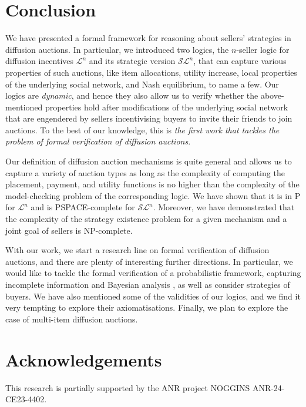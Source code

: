 \documentclass[letterpaper]{article} %
\theoremstyle{definition}
\begin{document}
\section{Conclusion}
We have presented a formal framework for reasoning about sellers' strategies in diffusion auctions. In particular, we introduced two logics, the $n$-seller logic for diffusion incentives $\mathcal{L}^n$ and its strategic version $\mathcal{SL}^n$, that can capture various properties of such auctions, like item allocations, utility increase, local properties of the underlying social network, and Nash equilibrium, to name a few. Our logics are \textit{dynamic}, and hence they also allow us to verify whether the above-mentioned properties hold after modifications of the underlying social network that are engendered by sellers incentivising buyers to invite their friends to join auctions. To the best of our knowledge, this is \textit{the first work that tackles the problem of formal verification of diffusion auctions}.  

Our definition of diffusion auction mechanisms is quite general and allows us to capture a variety of auction types as long as the complexity of computing the placement, payment, and utility functions is no higher than the complexity of the model-checking problem of the corresponding logic. %
We have shown that it is in P for $\mathcal{L}^n$ and is PSPACE-complete for $\mathcal{SL}^n$. Moreover, we have demonstrated that the complexity of the strategy existence problem for a given mechanism and a joint goal of sellers is NP-complete.   

With our work, we start a research line on formal verification of diffusion auctions, and there are plenty of interesting further directions. %
In particular, we would like to tackle the formal verification of 
a probabilistic framework, capturing incomplete information and Bayesian analysis
\cite{huang2025approximate}, as well as consider strategies of buyers. We have also mentioned some of the validities of our logics, and we find it very tempting to explore their axiomatisations. Finally, we plan to explore the case of multi-item diffusion auctions.

\section*{Acknowledgements}
This research is partially supported by the ANR project NOGGINS ANR-24-CE23-4402.




\end{document}
